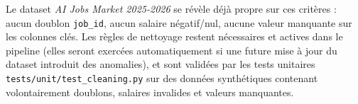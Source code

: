 \begin{constat}[Interprétation]
Le dataset \emph{AI Jobs Market 2025-2026} se révèle déjà propre sur
ces critères : aucun doublon \texttt{job\_id}, aucun salaire
négatif/nul, aucune valeur manquante sur les colonnes clés. Les règles
de nettoyage restent nécessaires et actives dans le pipeline (elles
seront exercées automatiquement si une future mise à jour du dataset
introduit des anomalies), et sont validées par les tests unitaires
\texttt{tests/unit/test\_cleaning.py} sur des données synthétiques
contenant volontairement doublons, salaires invalides et valeurs
manquantes.
\end{constat}
